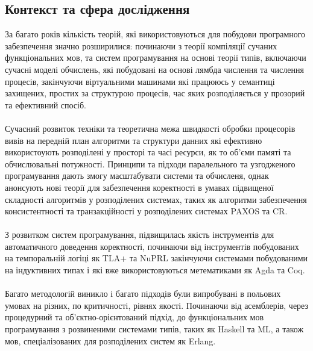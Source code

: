 \documentclass[11pt,oneside]{article}
\begin{document}
\newpage
\subsection{Контекст та сфера дослідження}

\vspace{0.5cm}
   За багато років кількість теорій, які використовуються для побудови програмного забезпечення значно розширилися:
   починаючи з теорії компіляції сучаних функціональних мов, та систем програмування на основі теорії типів,
   включаючи сучасні моделі обчислень, які побудовані на основі лямбда числення та числення процесів, закінчуючи віртуальними
   машинами які працююсь у семантиці захищених, простих за структурою процесів, час яких розподіляється
   у прозорий та ефективний спосіб.

   \paragraph{}
   Сучасний розвиток техніки та теоретична межа швидкості обробки процесорів вивів на передній план алгоритми та структури
   данних які ефективно використоують розподілені у просторі та часі ресурси, як то об’єми памяті та обчислювальні потужності.
   Принципи та підходи паралельного та узгодженого програмування дають змогу масштабувати системи та обчисленя, однак
   анонсують нові теорії для забезпечення коректності в умавах підвищеної складності алгоритмів у розподілених системах,
   таких як алгоритми забезпечення консистентності та транзакційності у розподілених системах PAXOS та CR.

   \paragraph{}
   З розвитком систем програмування, підвищилась якість інструментів для автоматичного доведення коректності,
   починаючи від інструментів побудованих на темпоральній логіці як TLA+ та NuPRL закінчуючи системами
   побудованими на індуктивних типах і які вже використовуються метематиками як Agda та Coq.

   \paragraph{}
   Багато методологій виникло і багато підходів були випробувані в польових умовах на різних, по критичності, рівнях якості.
   Починаючи від асемблерів, через процедурний та об’єктно-орієнтований підхід, до функціональних мов програмування
   з розвиненими системами типів, таких як Haskell та ML, а також мов, спеціалізованих для розподілених систем як Erlang.
\end{document}
